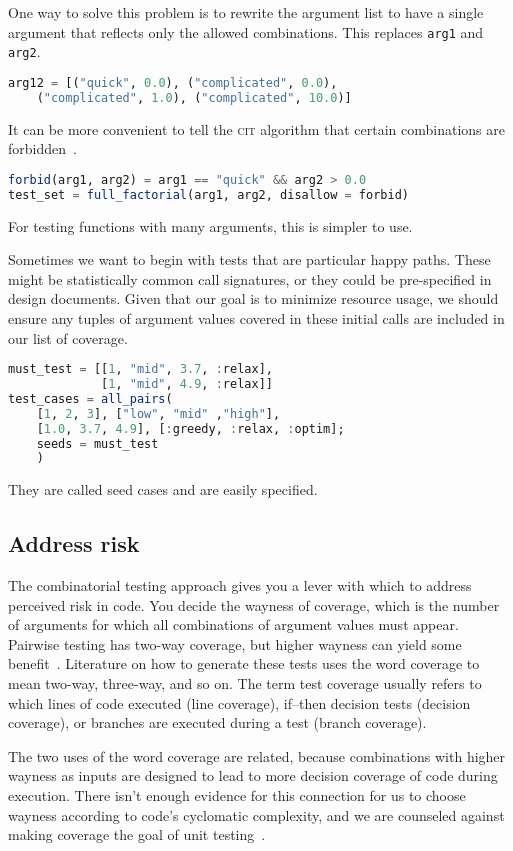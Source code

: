 \documentclass{juliacon}
\newcommand{\cit}{\textsc{cit}\xspace}
\begin{document}
One way to solve this problem is to rewrite the argument list to have a single argument that reflects only the allowed combinations. This replaces \verb|arg1| and \verb|arg2|.
\begin{lstlisting}[language=Julia]
arg12 = [("quick", 0.0), ("complicated", 0.0),
    ("complicated", 1.0), ("complicated", 10.0)]
\end{lstlisting}
It can be more convenient to tell the \cit algorithm that certain combinations are forbidden~\cite{Petke2015-ex,Grindal2006-vy}.
\begin{lstlisting}[language=Julia]
forbid(arg1, arg2) = arg1 == "quick" && arg2 > 0.0
test_set = full_factorial(arg1, arg2, disallow = forbid)
\end{lstlisting}
For testing functions with many arguments, this is simpler to use.

\vskip 6pt
Sometimes we want to begin with tests that are particular happy paths. These might be statistically common call signatures, or they could be pre-specified in design documents. Given that our goal is to minimize resource usage, we should ensure any tuples of argument values covered in these initial calls are included in our list of coverage.
\begin{lstlisting}[language=Julia]
must_test = [[1, "mid", 3.7, :relax],
             [1, "mid", 4.9, :relax]]
test_cases = all_pairs(
    [1, 2, 3], ["low", "mid" ,"high"],
    [1.0, 3.7, 4.9], [:greedy, :relax, :optim];
    seeds = must_test
    )
\end{lstlisting}
They are called seed cases and are easily specified.

\subsection{Address risk}

The combinatorial testing approach gives you a lever with which to address perceived risk in code. You decide the wayness of coverage, which is the number of arguments for which all combinations of argument values must appear. Pairwise testing has two-way coverage, but higher wayness can yield some benefit~\cite{Petke2015-ex}. Literature on how to generate these tests uses the word coverage to mean two-way, three-way, and so on. The term test coverage usually refers to which lines of code executed (line coverage), if--then decision tests (decision coverage), or branches are executed during a test (branch coverage).

\vskip 6pt
The two uses of the word coverage are related, because combinations with higher wayness as inputs are designed to lead to more decision coverage of code during execution. There isn't enough evidence for this connection for us to choose wayness according to code's cyclomatic complexity, and we are counseled against making coverage the goal of unit testing~\cite{Inozemtseva2014-gz}.
\end{document}
